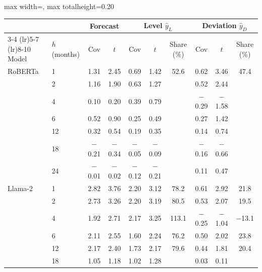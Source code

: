 \begin{table}[htbp]
{\begin{adjustbox}{max width=\linewidth, max totalheight=0.20\textheight}
\begin{tabular}{llcccccccc}
\toprule
\multicolumn{2}{c}{} & \multicolumn{2}{c}{Forecast} & \multicolumn{3}{c}{Level $\hat y_L$} & \multicolumn{3}{c}{Deviation $\hat y_D$} \\
\cmidrule(lr){3-4} \cmidrule(lr){5-7} \cmidrule(lr){8-10}
Model & $h$ (months) & Cov & $t$ & Cov & $t$ & Share (\%) & Cov & $t$ & Share (\%) \\
\midrule
RoBERTa & 1 & \phantom{$-$}1.31 & \phantom{$-$}2.45 & \phantom{$-$}0.69 & \phantom{$-$}1.42 & \phantom{0}52.6 & \phantom{$-$}0.62 & \phantom{$-$}3.46 & \phantom{$-$}47.4 \\
 & 2 & \phantom{$-$}1.16 & \phantom{$-$}1.90 & \phantom{$-$}0.63 & \phantom{$-$}1.27 &  & \phantom{$-$}0.52 & \phantom{$-$}2.44 &  \\
 & 4 & \phantom{$-$}0.10 & \phantom{$-$}0.20 & \phantom{$-$}0.39 & \phantom{$-$}0.79 &  & $-$0.29 & $-$1.58 &  \\
 & 6 & \phantom{$-$}0.52 & \phantom{$-$}0.90 & \phantom{$-$}0.25 & \phantom{$-$}0.49 &  & \phantom{$-$}0.27 & \phantom{$-$}1.42 &  \\
 & 12 & \phantom{$-$}0.32 & \phantom{$-$}0.54 & \phantom{$-$}0.19 & \phantom{$-$}0.35 &  & \phantom{$-$}0.14 & \phantom{$-$}0.74 &  \\
 & 18 & $-$0.21 & $-$0.34 & $-$0.05 & $-$0.09 &  & $-$0.16 & $-$0.66 &  \\
 & 24 & $-$0.01 & $-$0.02 & $-$0.12 & $-$0.21 &  & \phantom{$-$}0.11 & \phantom{$-$}0.47 &  \\
\midrule
Llama-2 & 1 & \phantom{$-$}2.82 & \phantom{$-$}3.76 & \phantom{$-$}2.20 & \phantom{$-$}3.12 & \phantom{0}78.2 & \phantom{$-$}0.61 & \phantom{$-$}2.92 & \phantom{$-$}21.8 \\
 & 2 & \phantom{$-$}2.73 & \phantom{$-$}3.26 & \phantom{$-$}2.20 & \phantom{$-$}3.19 & \phantom{0}80.5 & \phantom{$-$}0.53 & \phantom{$-$}2.07 & \phantom{$-$}19.5 \\
 & 4 & \phantom{$-$}1.92 & \phantom{$-$}2.71 & \phantom{$-$}2.17 & \phantom{$-$}3.25 & 113.1 & $-$0.25 & $-$1.04 & $-$13.1 \\
 & 6 & \phantom{$-$}2.11 & \phantom{$-$}2.55 & \phantom{$-$}1.60 & \phantom{$-$}2.24 & \phantom{0}76.2 & \phantom{$-$}0.50 & \phantom{$-$}2.02 & \phantom{$-$}23.8 \\
 & 12 & \phantom{$-$}2.17 & \phantom{$-$}2.40 & \phantom{$-$}1.73 & \phantom{$-$}2.17 & \phantom{0}79.6 & \phantom{$-$}0.44 & \phantom{$-$}1.81 & \phantom{$-$}20.4 \\
 & 18 & \phantom{$-$}1.05 & \phantom{$-$}1.18 & \phantom{$-$}1.02 & \phantom{$-$}1.28 &  & \phantom{$-$}0.03 & \phantom{$-$}0.11 &  \\

\end{tabular}
\end{adjustbox}}
\end{table}
